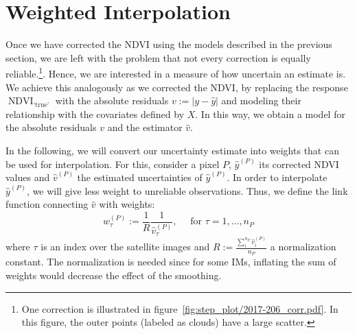 \section{Weighted Interpolation}{
    \label{sec:corr_uncertainty}
    Once we have corrected the NDVI using the models described in the previous section, we are left with the problem that not every correction is equally reliable.\footnote{One correction is illustrated in figure~\ref{fig:step_plot/2017-206_corr.pdf}. In this figure, the outer points (labeled as clouds) have a large scatter.}. Hence, we are interested in a measure of how uncertain an estimate is. 
    We achieve this analogously as we corrected the NDVI, by replacing the response $\operatorname{NDVI}_\text{`true'}$ with the absolute residuals $v := \left|y -\hat y\right|$ and modeling their relationship with the covariates defined by $X$.  In this way, we obtain a model for the absolute residuals $v$ and the estimator $\hat v$. 
    
    \label{sec:corr_link}
    In the following, we will convert our uncertainty estimate into weights that can be used for interpolation. For this, consider a pixel $P$, $\hat y^{(P)}$ its corrected NDVI values and $\hat v^{(P)}$ the estimated uncertainties of $\hat y^{(P)}$. In order to interpolate $\hat y^{(P)}$, we will give less weight to unreliable observations. Thus, we define the link function connecting $\hat v$ with weights: 
    \begin{equation}
        \label{eq:corr_link}
        w^{(P)}_\tau:=\frac{1}{R} \frac{1}{\hat v^{(P)}_\tau}, 
        \quad \text{ for } \tau=1,\dots, n_P
    \end{equation}  
    where $\tau$ is an index over the satellite images and $R:=\frac{\sum_i^{n_P}\hat v^{(P)}_i}{n_P}$ a normalization constant. The normalization is needed since for some {{IM}}s, inflating the sum of weights would decrease the effect of the smoothing. 
}


